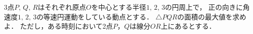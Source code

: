 \documentclass[../../main.tex]{subfiles}
\begin{document}
3点$P, \, Q, \, R$はそれぞれ原点$O$を中心とする半径$1, \, 2, \, 3$の円周上で，
正の向きに角速度$1, \, 2, \, 3$の等速円運動をしている動点とする．
$\triangle PQR$の面積の最大値を求めよ．
ただし，ある時刻において2点$P$，$Q$は線分$OR$上にあるとする．
\end{document}
